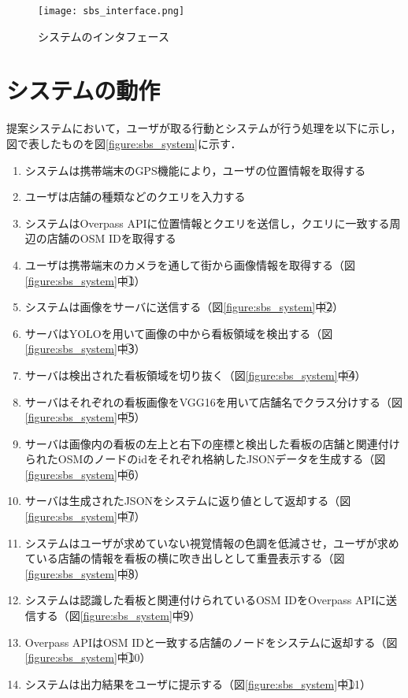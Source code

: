\begin{figure}[tb]
  \centerline{\texttt{[image: sbs\_interface.png]}}
  \caption{システムのインタフェース}
  \label{figure:sbs_interface}
\end{figure}

\section{システムの動作}
  提案システムにおいて，ユーザが取る行動とシステムが行う処理を以下に示し，図で表したものを図\ref{figure:sbs_system}に示す．
  \begin{enumerate}
    \item システムは携帯端末のGPS機能により，ユーザの位置情報を取得する
    \item ユーザは店舗の種類などのクエリを入力する
    \item システムはOverpass APIに位置情報とクエリを送信し，クエリに一致する周辺の店舗のOSM IDを取得する
    \item ユーザは携帯端末のカメラを通して街から画像情報を取得する（図\ref{figure:sbs_system}中\textcircled{\scriptsize 1}）
    \item システムは画像をサーバに送信する（図\ref{figure:sbs_system}中\textcircled{\scriptsize 2}）
    \item サーバはYOLOを用いて画像の中から看板領域を検出する（図\ref{figure:sbs_system}中\textcircled{\scriptsize 3}）
    \item サーバは検出された看板領域を切り抜く（図\ref{figure:sbs_system}中\textcircled{\scriptsize 4}）
    \item サーバはそれぞれの看板画像をVGG16を用いて店舗名でクラス分けする（図\ref{figure:sbs_system}中\textcircled{\scriptsize 5}）
    \item サーバは画像内の看板の左上と右下の座標と検出した看板の店舗と関連付けられたOSMのノードのidをそれぞれ格納したJSONデータを生成する（図\ref{figure:sbs_system}中\textcircled{\scriptsize 6}）
    \item サーバは生成されたJSONをシステムに返り値として返却する（図\ref{figure:sbs_system}中\textcircled{\scriptsize 7}）
    \item システムはユーザが求めていない視覚情報の色調を低減させ，ユーザが求めている店舗の情報を看板の横に吹き出しとして重畳表示する（図\ref{figure:sbs_system}中\textcircled{\scriptsize 8}）
    \item システムは認識した看板と関連付けられているOSM IDをOverpass APIに送信する（図\ref{figure:sbs_system}中\textcircled{\scriptsize 9}）
    \item Overpass APIはOSM IDと一致する店舗のノードをシステムに返却する（図\ref{figure:sbs_system}中\textcircled{\scriptsize 10}）
    \item システムは出力結果をユーザに提示する（図\ref{figure:sbs_system}中\textcircled{\scriptsize 11}）
  \end{enumerate}

